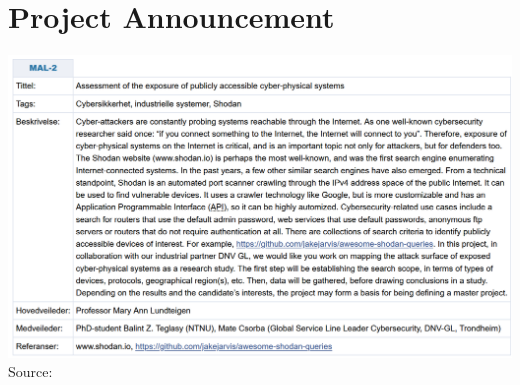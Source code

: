 \section{Project Announcement}
\includegraphics[width=\textwidth]{Figurer/project_announcement.png}
Source: \cite{announcement}